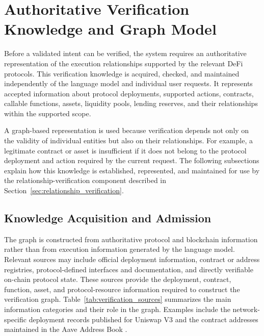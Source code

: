 
\section{Authoritative Verification Knowledge and Graph Model}
\label{sec:verification_knowledge}

Before a validated intent can be verified, the system requires an
authoritative representation of the execution relationships supported by
the relevant DeFi protocols. This verification knowledge is acquired,
checked, and maintained independently of the language model and individual
user requests. It represents accepted information about protocol deployments,
supported actions, contracts, callable functions, assets, liquidity pools,
lending reserves, and their relationships within the supported scope.

A graph-based representation is used because verification depends not only
on the validity of individual entities but also on their relationships.
For example, a legitimate contract or asset is insufficient if it does
not belong to the protocol deployment and action required by the current
request. The following subsections explain how this knowledge is established,
represented, and maintained for use by the relationship-verification component
described in Section~\ref{sec:relationship_verification}.

\subsection{Knowledge Acquisition and Admission}

The graph is constructed from authoritative protocol and blockchain information
rather than from execution information generated by the language model.
Relevant sources may include official deployment information, contract or
address registries, protocol-defined interfaces and documentation, and directly
verifiable on-chain protocol state. These sources provide the deployment, contract, function, asset, and
protocol-resource information required to construct the verification graph.
Table~\ref{tab:verification_sources} summarizes the main information categories
and their role in the graph. Examples include the network-specific deployment records published for Uniswap V3 and the contract addresses maintained in the Aave Address Book \cite{UniswapV3Deployments,AaveAddressBook}.

